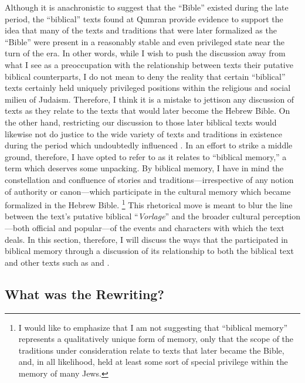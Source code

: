 Although it is anachronistic to suggest that the ``Bible''  existed during the late \secondtemple period, the ``biblical'' texts found at Qumran provide evidence to support the idea that many of the texts and traditions that were later formalized as the ``Bible'' were present in a reasonably stable and even privileged state near the turn of the era. In other words, while I wish to push the discussion away from what I see as a preoccupation with the relationship between \rwb texts their putative biblical counterparts, I do not mean to deny the reality that certain ``biblical'' texts certainly held uniquely privileged positions within the religious and social milieu of \secondtemple Judaism. Therefore, I think it is a mistake to jettison any discussion of \rwb texts as they relate to the texts that would later become the Hebrew Bible. On the other hand, restricting our discussion to those later biblical texts would likewise not do justice to the wide variety of texts and traditions in existence during the \secondtemple period which undoubtedly influenced \ga. In an effort to strike a middle ground, therefore, I have opted to refer to \ga as it relates to ``biblical memory,'' a term which deserves some unpacking. By biblical memory, I have in mind the constellation and confluence of stories and traditions---irrespective of any notion of authority or canon---which participate in the cultural memory which became formalized in the Hebrew Bible.%
%
\footnote{I would like to emphasize that I am not suggesting that ``biblical memory'' represents a qualitatively unique form of memory, only that the scope of the traditions under consideration relate to texts that later became the Bible, and, in all likelihood, held at least some sort of special privilege within the memory of many \secondtemple Jews.}
%
This rhetorical move is meant to blur the line between the \rwb text's putative biblical ``\emph{Vorlage}'' and the broader cultural perception---both official and popular---of the events and characters with which the \rwb text deals. In this section, therefore, I will discuss the ways that the \ga participated in biblical memory through a discussion of its relationship to both the biblical text and other \secondtemple texts such as \jub and \firstenoch.

\subsection{What was the \ga Rewriting?}

